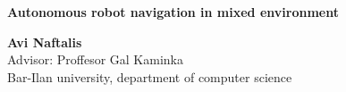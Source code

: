 \documentclass[a0,portrait]{a0poster}
\begin{document}


\begin{minipage}[b]{1\linewidth}
  \VeryHuge \color{NavyBlue} \textbf{Autonomous robot navigation in mixed environment} \color{Black}\\ %

  \vspace{1cm} %

  \huge \textbf{Avi Naftalis}\\[0.6cm] %
  \huge Advisor: Proffesor Gal Kaminka \\[0.5cm] %
  \huge Bar-Ilan university, department of computer science \\[0.5cm] %
\end{minipage}
%
\begin{minipage}[b]{0.25\linewidth}
\end{minipage}

\vspace{1cm} %

\end{document}
